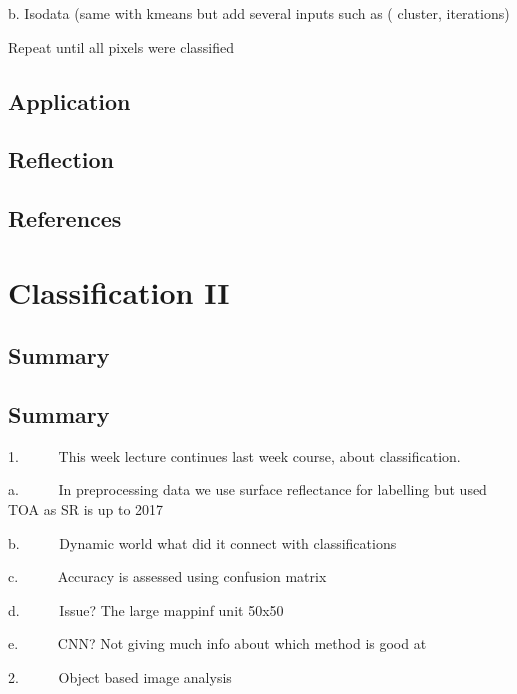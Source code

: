 \documentclass[
  letterpaper,
  DIV=11,
  numbers=noendperiod]{scrreprt}
\begin{document}
b. Isodata (same with kmeans but add several inputs such as ( cluster,
iterations)

Repeat until all pixels were classified

\hypertarget{application-4}{%
\section{Application}\label{application-4}}

\hypertarget{reflection-3}{%
\section{Reflection}\label{reflection-3}}

\hypertarget{references-3}{%
\section{References}\label{references-3}}


\hypertarget{classification-ii}{%
\chapter{Classification II}\label{classification-ii}}

\hypertarget{summary-6}{%
\section{Summary}\label{summary-6}}

\hypertarget{summary-7}{%
\section{Summary}\label{summary-7}}

1.~~~~~ This week lecture continues last week course, about
classification.

a.~~~~~ In preprocessing data we use surface reflectance for labelling
but used TOA as SR is up to 2017

b.~~~~~ Dynamic world what did it connect with classifications

c.~~~~~ Accuracy is assessed using confusion matrix

d.~~~~~ Issue? The large mappinf unit 50x50

e.~~~~~ CNN? Not giving much info about which method is good at

2.~~~~~ Object based image analysis
\end{document}
